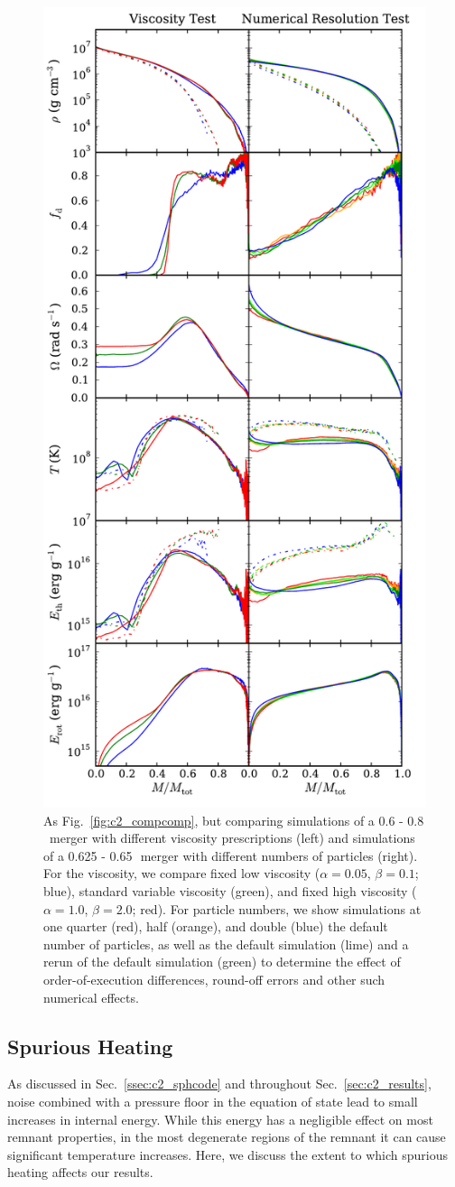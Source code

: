 \begin{figure}
\centering
\includegraphics[angle=0,width=0.5\columnwidth]{chapter2_zhu+13/figures/viscnumcomp.pdf}
\caption{As Fig.~\ref{fig:c2_compcomp}, but comparing simulations of a 0.6 - 0.8\,\Msun\ merger with different viscosity prescriptions (left) and simulations of a 0.625 - 0.65\,\Msun\ merger with different numbers of particles (right).  For the viscosity, we compare fixed low viscosity ($\alpha=0.05$, $\beta=0.1$; blue), standard variable viscosity (green), and fixed high viscosity ($\alpha=1.0$, $\beta=2.0$; red).  For particle numbers, we show simulations at one quarter (red), half (orange), and double (blue) the default number of particles, as well as the default simulation (lime) and a rerun of the default simulation (green) to determine the effect of order-of-execution differences, round-off errors and other such numerical effects.}
\label{fig:c2_viscnumcomp}
\end{figure}

\subsection{Spurious Heating}
\label{ssec:c2_spheat}

As discussed in Sec.~\ref{ssec:c2_sphcode} and throughout Sec.~\ref{sec:c2_results}, noise combined with a pressure floor in the equation of state lead to small increases in internal energy.  While this energy has a negligible effect on most remnant properties, in the most degenerate regions of the remnant it can cause significant temperature increases.  Here, we discuss the extent to which spurious heating affects our results.


